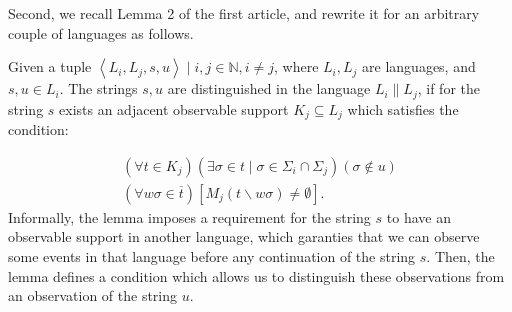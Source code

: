 \documentclass[a4paper, 10pt, conference]{ieeeconf}
\begin{document}
Second, we recall Lemma 2 of the first article, and rewrite it for an arbitrary
couple of languages as follows.

\begin{lemma}
Given a tuple $\left< L_i, L_j, s, u\right> \mid i, j \in \mathbb{N}, i\neq j$,
where $L_i, L_j$ are languages, and $s, u \in L_i$. The strings $s, u$ are
distinguished in the language $L_i \parallel L_j$, if for the string $s$ exists
an adjacent observable support $K_j \subseteq L_j$ which satisfies the
condition:
\end{lemma} 
\begin{equation}
\label{con:distinquished}
	\begin{array}{l}
	 	(\forall t \in K_j)
	 	(\exists \sigma \in t \mid \sigma \in \Sigma_i \cap \Sigma_j)
	 	(\sigma \not \in u)
	 	\\
	 	(\forall w\sigma \in \overline{t})
	 	[M_j(t\backslash w\sigma) \neq \emptyset].
	\end{array}
\end{equation}
Informally, the lemma imposes a requirement for the string $s$ to have an
observable support in another language, which garanties that we can observe some
events in that language before any continuation of the string $s$.
Then, the lemma defines a condition which allows us to distinguish these
observations from an observation of the string $u$.
\end{document}
